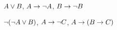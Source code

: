 \begin{practiceproblems}
\begin{earg}
		\item $A \vee B$, $A \rightarrow \neg A$, $B \rightarrow \neg B$ \vspace{.5ex}%
		
		
		\item $\neg(\neg A \vee B) $, $A \rightarrow \neg C$, $A \rightarrow (B \rightarrow C)$\vspace{.5ex} %
		
		

\end{earg}
\end{practiceproblems}
